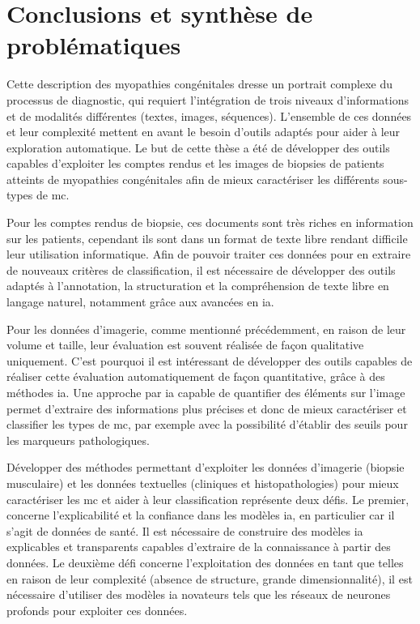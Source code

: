 \section{Conclusions et synthèse de problématiques}
Cette description des myopathies congénitales dresse un portrait complexe du processus de diagnostic, qui requiert l'intégration de trois niveaux d'informations et de modalités différentes (textes, images, séquences). L'ensemble de ces données et leur complexité mettent en avant le besoin d'outils adaptés pour aider à leur exploration automatique. Le but de cette thèse a été de développer des outils capables d'exploiter les comptes rendus et les images de biopsies de patients atteints de myopathies congénitales afin de mieux caractériser les différents sous-types de \gls{mc}.

Pour les comptes rendus de biopsie, ces documents sont très riches en information sur les patients, cependant ils sont dans un format de texte libre rendant difficile leur utilisation informatique. Afin de pouvoir traiter ces données pour en extraire de nouveaux critères de classification, il est nécessaire de développer des outils adaptés à l'annotation, la structuration et la compréhension de texte libre en langage naturel, notamment grâce aux avancées en \gls{ia}. 

Pour les données d'imagerie, comme mentionné précédemment, en raison de leur volume et taille, leur évaluation est souvent réalisée de façon qualitative uniquement. C'est pourquoi il est intéressant de développer des outils capables de réaliser cette évaluation automatiquement de façon quantitative, grâce à des méthodes \gls{ia}. Une approche par \gls{ia} capable de quantifier des éléments sur l'image permet d'extraire des informations plus précises et donc de mieux caractériser et classifier les types de \gls{mc}, par exemple avec la possibilité d'établir des seuils pour les marqueurs pathologiques.

Développer des méthodes permettant d'exploiter les données d'imagerie (biopsie musculaire) et les données textuelles (cliniques et histopathologies) pour mieux caractériser les \gls{mc} et aider à leur classification représente deux défis. Le premier, concerne l'explicabilité et la confiance dans les modèles \gls{ia}, en particulier car il s'agit de données de santé. Il est nécessaire de construire des modèles \gls{ia} explicables et transparents capables d'extraire de la connaissance à partir des données. Le deuxième défi concerne l'exploitation des données en tant que telles en raison de leur complexité (absence de structure, grande dimensionnalité), il est nécessaire d'utiliser des modèles \gls{ia} novateurs tels que les réseaux de neurones profonds pour exploiter ces données.


